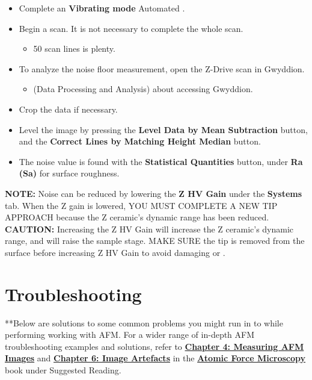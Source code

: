 \documentclass{../lab}
\begin{document}
\begin{itemize}
        \item Complete an \textbf{Vibrating mode} Automated \textbf{}.

        \item Begin a scan.  It is not necessary to complete the whole scan.

        \begin{itemize}
            \item 50 scan lines is plenty.

        \end{itemize}

        \item To analyze the noise floor measurement, open the Z-Drive scan in Gwyddion.

        \begin{itemize}
            \item \textbf{} (Data Processing and Analysis) about accessing Gwyddion.

        \end{itemize}

        \item Crop the data if necessary.

        \item Level the image by pressing the \textbf{Level Data by Mean Subtraction} button, and the \textbf{Correct Lines by Matching Height Median} button.

        \item The noise value is found with the\textbf{ Statistical Quantities }button, under \textbf{Ra (Sa)} for surface roughness.

    \end{itemize}

\textbf{NOTE: }Noise can be reduced by lowering the \textbf{Z HV Gain} under the \textbf{Systems} tab.  When the Z gain is lowered, YOU MUST COMPLETE A NEW TIP APPROACH because the Z ceramic’s dynamic range has been reduced.
\textbf{CAUTION: }Increasing the Z HV Gain will increase the Z ceramic’s dynamic range, and will raise the sample stage.  MAKE SURE the tip is removed from the surface before increasing Z HV Gain to avoid damaging or \textbf{}.

\section{Troubleshooting}
\label{sec:troubleshooting}

**Below are solutions to some common problems you might run in to while performing working with AFM.  For a wider range of in-depth AFM troubleshooting examples and solutions, refer to \href{http://experimentationlab.berkeley.edu/afm-book}{\textbf{Chapter 4: Measuring AFM Images}} and \href{http://experimentationlab.berkeley.edu/afm-book}{\textbf{Chapter 6: Image Artefacts}} in the \href{http://experimentationlab.berkeley.edu/afm-book}{\textbf{Atomic Force Microscopy}} book under Suggested Reading.
\end{document}
